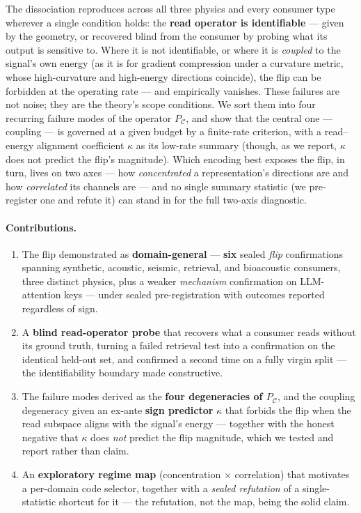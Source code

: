 \documentclass[11pt]{article}
\theoremstyle{remark}
\newcommand{\PC}{P_{\mathcal{C}}}
\newcommand{\kalign}{\kappa}
\begin{document}
The dissociation reproduces across all three physics and every consumer type wherever a
single condition holds: the \textbf{read operator is identifiable} --- given by the
geometry, or recovered blind from the consumer by probing what its output is sensitive
to. Where it is not identifiable, or where it is \emph{coupled} to the signal's own
energy (as it is for gradient compression under a curvature metric, whose high-curvature
and high-energy directions coincide), the flip can be forbidden at the operating rate ---
and empirically vanishes. These failures are not noise; they are the theory's scope conditions. We sort them
into four recurring failure modes of the operator $\PC$, and show that the central one
--- coupling --- is governed at a given budget by a finite-rate criterion, with a
read--energy alignment coefficient $\kalign$ as its low-rate summary (though, as we report,
$\kalign$ does not predict the flip's magnitude). Which encoding best exposes the flip, in turn, lives on two
axes --- how \emph{concentrated} a representation's directions are and how
\emph{correlated} its channels are --- and no single summary statistic (we pre-register
one and refute it) can stand in for the full two-axis diagnostic.

\paragraph{Contributions.}
\begin{enumerate}\itemsep2pt
\item The flip demonstrated as \textbf{domain-general} --- \textbf{six} sealed \emph{flip}
confirmations spanning synthetic, acoustic, seismic, retrieval, and bioacoustic consumers,
three distinct physics, plus a weaker \emph{mechanism} confirmation on LLM-attention keys
--- under sealed pre-registration with outcomes reported regardless of sign.
\item A \textbf{blind read-operator probe} that recovers what a consumer reads without
its ground truth, turning a failed retrieval test into a confirmation on the identical
held-out set, and confirmed a second time on a fully virgin split --- the identifiability
boundary made constructive.
\item The failure modes derived as the \textbf{four degeneracies of $\PC$}, and the
coupling degeneracy given an ex-ante \textbf{sign predictor} $\kalign$ that forbids the
flip when the read subspace aligns with the signal's energy --- together with the honest
negative that $\kalign$ does \emph{not} predict the flip magnitude, which we tested and
report rather than claim.
\item An \textbf{exploratory regime map} (concentration $\times$ correlation) that motivates
a per-domain code selector, together with a \emph{sealed refutation} of a single-statistic
shortcut for it --- the refutation, not the map, being the solid claim.
\end{enumerate}
\end{document}
